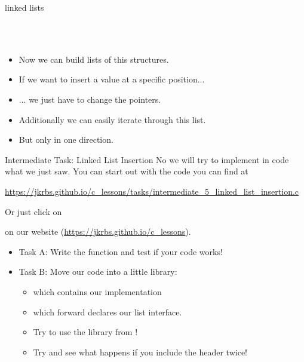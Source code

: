 \documentclass[10pt,graphics,aspectratio=169,table]{beamer}
\begin{document}
\begin{frame}{linked lists}
\begin{tikzpicture}[scale=.73,font=\scriptsize]
		
	\end{tikzpicture}
	\ \\\ \\
	\begin{itemize}[<+->]
		\item Now we can build lists of this structures.
		\item If we want to insert a value at a specific position...
		\item ... we just have to change the pointers.
	\end{itemize}
	
	\begin{itemize}
		\item<6-> Additionally we can easily iterate through this list.
		\item<6-> But only in one direction.
	\end{itemize}
	
\end{frame}

\begin{frame}{Intermediate Task: Linked List Insertion}
    No we will try to implement in code what we just saw.
    You can start out with the code you can find at

    \small
    \url{https://jkrbs.github.io/c_lessons/tasks/intermediate_5_linked_list_insertion.c}
    
    Or just click on 
   
    on our website (\url{https://jkrbs.github.io/c_lessons}).

    \begin{itemize}
		\item Task A: Write the function  and test if your code works!
        \item Task B: Move our code into a little library: 
        \begin{itemize}
            \item {} which contains our implementation
            \item {} which forward declares our list interface.
             \item Try to use the library from !
            \item Try and see what happens if you include the  header twice!
        \end{itemize}
       
	\end{itemize}
\end{frame}
\end{document}

